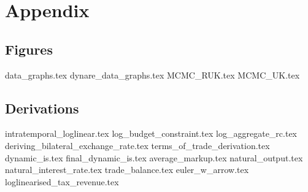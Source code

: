 \section{Appendix}
\subsection{Figures}
{data_graphs.tex}
{dynare_data_graphs.tex}
{MCMC_RUK.tex}
{MCMC_UK.tex}

\subsection{Derivations}
\renewcommand{\theequation}{A.\arabic{equation}}
{intratemporal_loglinear.tex}
{log_budget_constraint.tex}
{log_aggregate_rc.tex}
{deriving_bilateral_exchange_rate.tex}
{terms_of_trade_derivation.tex}
{dynamic_is.tex}
{final_dynamic_is.tex}
{average_markup.tex}
{natural_output.tex}
{natural_interest_rate.tex}
{trade_balance.tex}
{euler_w_arrow.tex}
{loglinearised_tax_revenue.tex}
